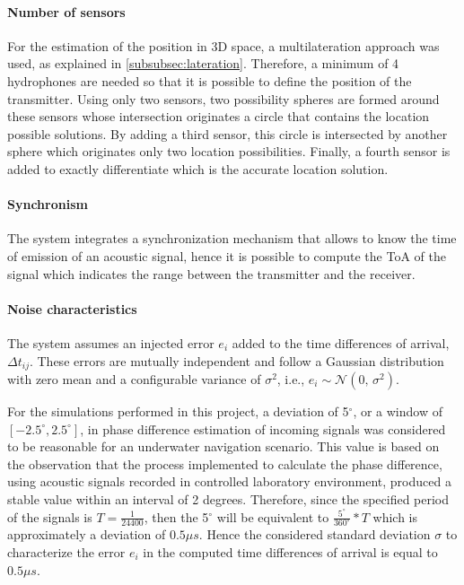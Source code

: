 \paragraph{Number of sensors} For the estimation of the position in 3D space, a multilateration approach was used, as explained in \ref{subsubsec:lateration}. Therefore, a minimum of 4 hydrophones are needed so that it is possible to define the position of the transmitter. Using only two sensors, two possibility spheres are formed around these sensors whose intersection originates a circle that contains the location possible solutions. By adding a third sensor, this circle is intersected by another sphere which originates only two location possibilities. Finally, a fourth sensor is added to exactly differentiate which is the accurate location solution.

\paragraph{Synchronism} The system integrates a synchronization mechanism that allows to know the time of emission of an acoustic signal, hence it is possible to compute the ToA of the signal which indicates the range between the transmitter and the receiver.

\paragraph{Noise characteristics} The system assumes an injected error $e_i$ added to the time differences of arrival, $ \Delta t_{ij}$. These errors are mutually independent and follow a Gaussian distribution with zero mean and a configurable variance of $\sigma^{2}$, i.e., $e_i \sim \mathcal{N}(0,\,\sigma^{2})$. 

For the simulations performed in this project, a deviation of 5$^{\circ}$, or a window of $[-2.5^{\circ},2.5^{\circ}]$, in phase difference estimation of incoming signals was considered to be reasonable for an underwater navigation scenario. This value is based on the observation that the process implemented to calculate the phase difference, using acoustic signals recorded in controlled laboratory environment, produced a stable value within an interval of 2 degrees. Therefore, since the specified period of the signals is $T = \frac{1}{24400}$, then the 5$^{\circ}$ will be equivalent to $\frac{5^{\circ}}{360^{\circ}}*T$ which is approximately a deviation of $0.5\mu s$. Hence the considered standard deviation $\sigma$ to characterize the error $e_i$ in the computed time differences of arrival is equal to $0.5\mu s$.

